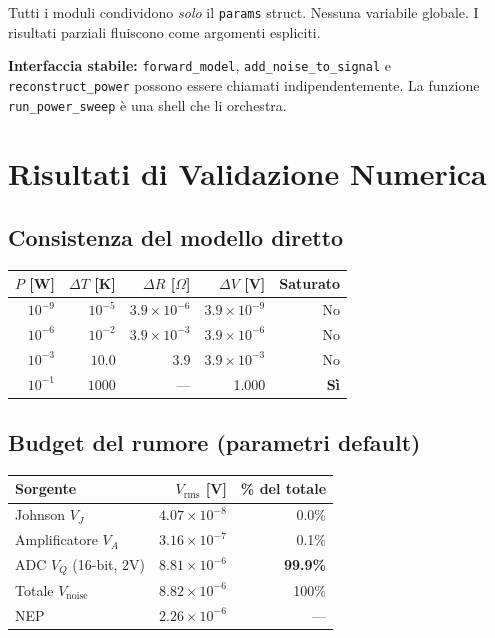 \documentclass[11pt,a4paper]{article}
\begin{document}
Tutti i moduli condividono \emph{solo} il \texttt{params} struct.
Nessuna variabile globale. I risultati parziali fluiscono come
argomenti espliciti.

\begin{infobox}
\textbf{Interfaccia stabile:} \texttt{forward\_model}, \texttt{add\_noise\_to\_signal}
e \texttt{reconstruct\_power} possono essere chiamati indipendentemente.
La funzione \texttt{run\_power\_sweep} è una shell che li orchestra.
\end{infobox}

\section{Risultati di Validazione Numerica}

\subsection{Consistenza del modello diretto}

\begin{center}
\begin{tabular}{rrrrr}
\toprule
$P$ [W] & $\Delta T$ [K] & $\Delta R$ [$\Omega$] & $\Delta V$ [V] & Saturato \\
\midrule
$10^{-9}$ & $10^{-5}$ & $3.9\times10^{-6}$ & $3.9\times10^{-9}$ & No \\
$10^{-6}$ & $10^{-2}$ & $3.9\times10^{-3}$ & $3.9\times10^{-6}$ & No \\
$10^{-3}$ & $10.0$    & $3.9$               & $3.9\times10^{-3}$ & No \\
$10^{-1}$ & $1000$    & ---                   & 1.000              & \textbf{Sì} \\
\bottomrule
\end{tabular}
\end{center}

\subsection{Budget del rumore (parametri default)}

\begin{center}
\begin{tabular}{lrr}
\toprule
Sorgente & $V_{\text{rms}}$ [V] & \% del totale \\
\midrule
Johnson $V_J$ & $4.07\times10^{-8}$ & 0.0\% \\
Amplificatore $V_A$ & $3.16\times10^{-7}$ & 0.1\% \\
ADC $V_Q$ (16-bit, 2V) & $8.81\times10^{-6}$ & \textbf{99.9\%} \\
\midrule
Totale $V_{\text{noise}}$ & $8.82\times10^{-6}$ & 100\% \\
\midrule
NEP & $2.26\times10^{-6}$ & --- \\
\bottomrule
\end{tabular}
\end{center}
\end{document}
